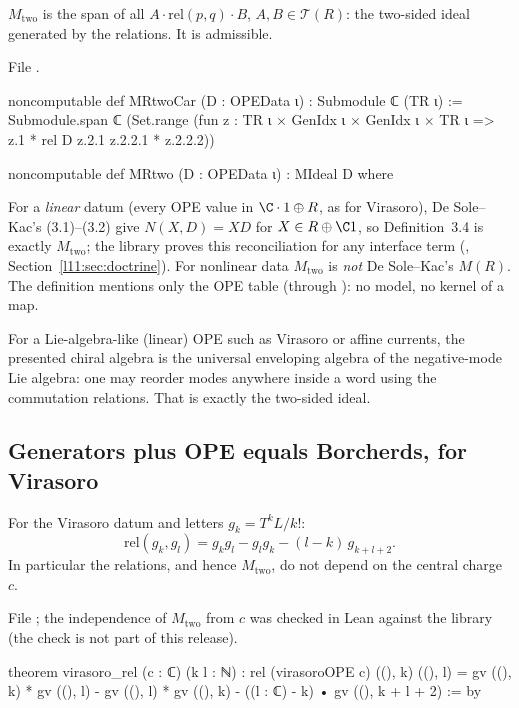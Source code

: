 \begin{definition}\label{l11:def:MRtwo}
$M_{\mathrm{two}}$ is the span of all $A\cdot\mathrm{rel}(p,q)\cdot B$, $A,B\in\mathcal T(R)$: the two-sided ideal generated by the
relations. It is admissible.
\end{definition}
\noindent File .
\begin{leancode}
noncomputable def MRtwoCar (D : OPEData ι) : Submodule ℂ (TR ι) :=
  Submodule.span ℂ (Set.range (fun z : TR ι × GenIdx ι × GenIdx ι × TR ι =>
    z.1 * rel D z.2.1 z.2.2.1 * z.2.2.2))

noncomputable def MRtwo (D : OPEData ι) : MIdeal D where
\end{leancode}

\begin{dictionary}
For a \emph{linear} datum (every OPE value in $\C\cdot1\oplus R$, as for Virasoro), De Sole--Kac's (3.1)--(3.2) give $N(X,D) = XD$ for
$X\in R\oplus\C1$, so Definition~3.4 is exactly $M_{\mathrm{two}}$; the library proves this reconciliation for any interface term
(, Section~\ref{l11:sec:doctrine}). For nonlinear data $M_{\mathrm{two}}$ is \emph{not} De Sole--Kac's
$M(R)$. The definition mentions only the OPE table (through ): no model, no kernel of a map.
\end{dictionary}

\begin{physics}
For a Lie-algebra-like (linear) OPE such as Virasoro or affine currents, the presented chiral algebra is the universal enveloping
algebra of the negative-mode Lie algebra: one may reorder modes anywhere inside a word using the commutation relations. That is
exactly the two-sided ideal.
\end{physics}

\subsection{Generators plus OPE equals Borcherds, for Virasoro}

\begin{theorem}\label{l11:thm:virrel}
For the Virasoro datum and letters $g_k = T^kL/k!$:
\begin{equation*}
\mathrm{rel}(g_k,g_l) = g_kg_l - g_lg_k - (l-k)\,g_{k+l+2}.
\end{equation*}
In particular the relations, and hence $M_{\mathrm{two}}$, do not depend on the central charge $c$.
\end{theorem}
\noindent File ; the independence of $M_{\mathrm{two}}$
from $c$ was checked in Lean against the library (the check is not part of this release).
\begin{leancode}
theorem virasoro_rel (c : ℂ) (k l : ℕ) :
    rel (virasoroOPE c) ((), k) ((), l)
      = gv ((), k) * gv ((), l) - gv ((), l) * gv ((), k)
        - ((l : ℂ) - k) • gv ((), k + l + 2) := by
\end{leancode}

